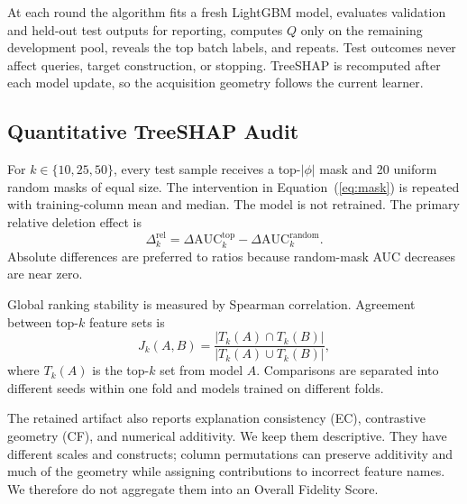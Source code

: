 At each round the algorithm fits a fresh LightGBM model, evaluates validation
and held-out test outputs for reporting, computes $Q$ only on the remaining
development pool, reveals the top batch labels, and repeats. Test outcomes never
affect queries, target construction, or stopping. TreeSHAP is recomputed after
each model update, so the acquisition geometry follows the current learner.

\subsection{Quantitative TreeSHAP Audit}

For $k\in\{10,25,50\}$, every test sample receives a top-$|\phi|$ mask and 20
uniform random masks of equal size. The intervention in
Equation~(\ref{eq:mask}) is repeated with training-column mean and median. The
model is not retrained. The primary relative deletion effect is
\begin{equation}
\Delta_k^{\mathrm{rel}}=
\Delta\mathrm{AUC}_k^{\mathrm{top}}-
\Delta\mathrm{AUC}_k^{\mathrm{random}}.
\label{eq:relative-deletion}
\end{equation}
Absolute differences are preferred to ratios because random-mask AUC decreases
are near zero.

Global ranking stability is measured by Spearman correlation. Agreement between
top-$k$ feature sets is
\begin{equation}
J_k(A,B)=\frac{|T_k(A)\cap T_k(B)|}{|T_k(A)\cup T_k(B)|},
\label{eq:jaccard}
\end{equation}
where $T_k(A)$ is the top-$k$ set from model $A$. Comparisons are separated into
different seeds within one fold and models trained on different folds.

The retained artifact also reports explanation consistency (EC), contrastive
geometry (CF), and numerical additivity. We keep them descriptive. They have
different scales and constructs; column permutations can preserve additivity
and much of the geometry while assigning contributions to incorrect feature
names. We therefore do not aggregate them into an Overall Fidelity Score.
